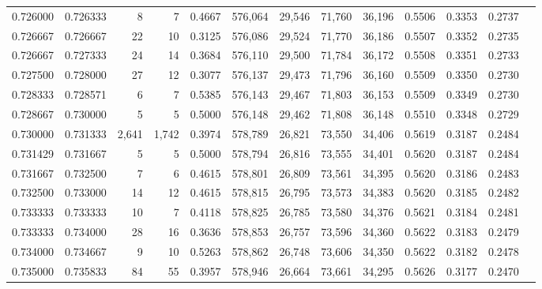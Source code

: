 \begin{tabular}{rrrrrrrrrrrrr}
0.726000 & 0.726333 &      8 &     7 &                                     0.4667 & 576,064 &  29,546 &  71,760 &  36,196 & 0.5506 & 0.3353 & 0.2737 \\
0.726667 & 0.726667 &     22 &    10 &                                     0.3125 & 576,086 &  29,524 &  71,770 &  36,186 & 0.5507 & 0.3352 & 0.2735 \\
0.726667 & 0.727333 &     24 &    14 &                                     0.3684 & 576,110 &  29,500 &  71,784 &  36,172 & 0.5508 & 0.3351 & 0.2733 \\
0.727500 & 0.728000 &     27 &    12 &                                     0.3077 & 576,137 &  29,473 &  71,796 &  36,160 & 0.5509 & 0.3350 & 0.2730 \\
0.728333 & 0.728571 &      6 &     7 &                                     0.5385 & 576,143 &  29,467 &  71,803 &  36,153 & 0.5509 & 0.3349 & 0.2730 \\
0.728667 & 0.730000 &      5 &     5 &                                     0.5000 & 576,148 &  29,462 &  71,808 &  36,148 & 0.5510 & 0.3348 & 0.2729 \\
0.730000 & 0.731333 &  2,641 & 1,742 &                                     0.3974 & 578,789 &  26,821 &  73,550 &  34,406 & 0.5619 & 0.3187 & 0.2484 \\
0.731429 & 0.731667 &      5 &     5 &                                     0.5000 & 578,794 &  26,816 &  73,555 &  34,401 & 0.5620 & 0.3187 & 0.2484 \\
0.731667 & 0.732500 &      7 &     6 &                                     0.4615 & 578,801 &  26,809 &  73,561 &  34,395 & 0.5620 & 0.3186 & 0.2483 \\
0.732500 & 0.733000 &     14 &    12 &                                     0.4615 & 578,815 &  26,795 &  73,573 &  34,383 & 0.5620 & 0.3185 & 0.2482 \\
0.733333 & 0.733333 &     10 &     7 &                                     0.4118 & 578,825 &  26,785 &  73,580 &  34,376 & 0.5621 & 0.3184 & 0.2481 \\
0.733333 & 0.734000 &     28 &    16 &                                     0.3636 & 578,853 &  26,757 &  73,596 &  34,360 & 0.5622 & 0.3183 & 0.2479 \\
0.734000 & 0.734667 &      9 &    10 &                                     0.5263 & 578,862 &  26,748 &  73,606 &  34,350 & 0.5622 & 0.3182 & 0.2478 \\
0.735000 & 0.735833 &     84 &    55 &                                     0.3957 & 578,946 &  26,664 &  73,661 &  34,295 & 0.5626 & 0.3177 & 0.2470 \\

\end{tabular}
